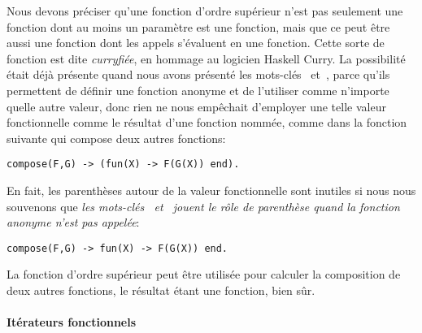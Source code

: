 Nous devons préciser qu'une fonction d'ordre supérieur n'est pas
seulement une fonction dont au moins un paramètre est une fonction,
mais que ce peut être aussi une fonction dont les appels s'évaluent en
une fonction. Cette sorte de fonction est dite
\emph{curryfiée}, en hommage au logicien Haskell
Curry. La possibilité était déjà présente quand nous avons présenté
les mots-clés ~et~, parce qu'ils permettent
de définir une fonction anonyme et de l'utiliser comme n'importe
quelle autre valeur, donc rien ne nous empêchait d'employer une telle
valeur fonctionnelle comme le résultat d'une fonction nommée, comme
dans la fonction suivante qui compose deux autres fonctions:
\begin{verbatim}
compose(F,G) -> (fun(X) -> F(G(X)) end).
\end{verbatim}
En fait, les parenthèses autour de la valeur fonctionnelle sont
inutiles si nous nous souvenons que \emph{les mots-clés
  ~et~ jouent le rôle de parenthèse quand la
  fonction anonyme n'est pas appelée}:
\begin{verbatim}
compose(F,G) -> fun(X) -> F(G(X)) end.
\end{verbatim}
La fonction d'ordre supérieur  peut être utilisée
pour calculer la composition de deux autres fonctions, le résultat
étant une fonction, bien sûr.


\paragraph{Itérateurs fonctionnels}
\label{par:maps}

